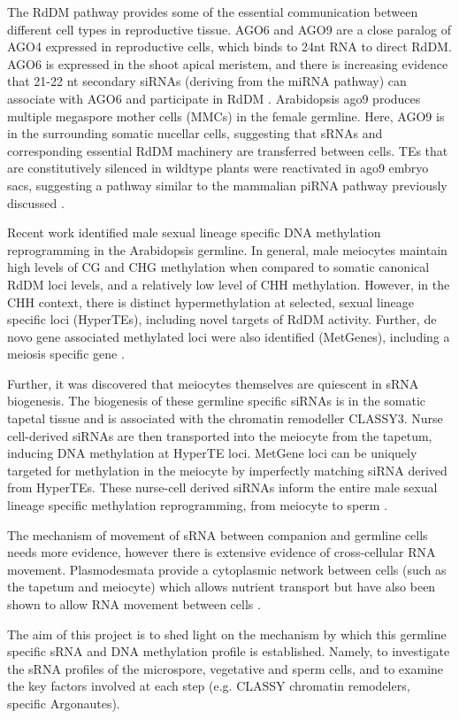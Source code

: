 The RdDM pathway provides some of the essential communication between different cell types in reproductive tissue. AGO6 and AGO9 are a close paralog of AGO4 expressed in reproductive cells, which binds to 24nt RNA to direct RdDM. AGO6 is expressed in the shoot apical meristem, and there is increasing evidence that 21-22 nt secondary siRNAs (deriving from the miRNA pathway) can associate with AGO6 and participate in RdDM \citep{RN133,RN61,RN33}. Arabidopsis ago9 produces multiple megaspore mother cells (MMCs) in the female germline. Here, AGO9 is in the surrounding somatic nucellar cells, suggesting that sRNAs and corresponding essential RdDM machinery are transferred between cells.  TEs that are constitutively silenced in wildtype plants were reactivated in ago9 embryo sacs, suggesting a pathway similar to the mammalian piRNA pathway previously discussed \citep{RN14}.

Recent work identified male sexual lineage specific DNA methylation reprogramming in the Arabidopsis germline. In general, male meiocytes maintain high levels of CG and CHG methylation when compared to somatic canonical RdDM loci levels, and a relatively low level of CHH methylation. However, in the CHH context, there is distinct hypermethylation at selected, sexual lineage specific loci (HyperTEs), including novel targets of RdDM activity. Further, de novo gene associated methylated loci were also identified (MetGenes), including a meiosis specific gene \citep{RN199}.

Further, it was discovered that meiocytes themselves are quiescent in sRNA biogenesis. The biogenesis of these germline specific siRNAs is in the somatic tapetal tissue and is associated with the chromatin remodeller CLASSY3. Nurse cell-derived siRNAs are then transported into the meiocyte from the tapetum, inducing DNA methylation at HyperTE loci. MetGene loci can be uniquely targeted for methylation in the meiocyte by imperfectly matching siRNA derived from HyperTEs. These nurse-cell derived siRNAs inform the entire male sexual lineage specific methylation reprogramming, from meiocyte to sperm \citep{RN187}.

The mechanism of movement of sRNA between companion and germline cells needs more evidence, however there is extensive evidence of cross-cellular RNA movement. Plasmodesmata provide a cytoplasmic network between cells (such as the tapetum and meiocyte) which allows nutrient transport but have also been shown to allow RNA movement between cells \citep{RN130,RN132,RN128}.

The aim of this project is to shed light on the mechanism by which this germline specific sRNA and DNA methylation profile is established. Namely, to investigate the sRNA profiles of the microspore, vegetative and sperm cells, and to examine the key factors involved at each step (e.g. CLASSY chromatin remodelers, specific Argonautes).  

